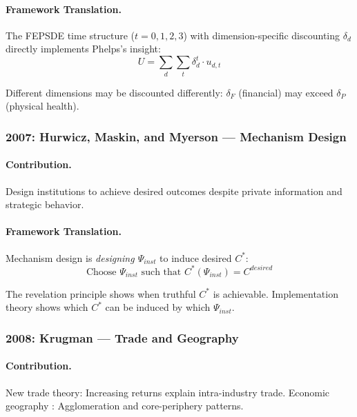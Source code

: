 \documentclass[12pt,a4paper]{article}
\begin{document}
\paragraph{Framework Translation.}
The FEPSDE time structure ($t = 0, 1, 2, 3$) with dimension-specific discounting
$\delta_d$ directly implements Phelps's insight:
\begin{equation}
  U = \sum_d \sum_t \delta_d^t \cdot u_{d,t}
\end{equation}

Different dimensions may be discounted differently:
$\delta_F$ (financial) may exceed $\delta_P$ (physical health).

\subsubsection{2007: Hurwicz, Maskin, and Myerson --- Mechanism Design}

\paragraph{Contribution.}
Design institutions to achieve desired outcomes despite private information
and strategic behavior.

\paragraph{Framework Translation.}
Mechanism design is \emph{designing $\Psi_{inst}$} to induce desired $C^*$:
\begin{equation}
  \text{Choose } \Psi_{inst} \text{ such that } C^*(\Psi_{inst}) = C^{desired}
\end{equation}

The revelation principle shows when truthful $C^*$ is achievable.
Implementation theory shows which $C^*$ can be induced by which $\Psi_{inst}$.

\subsubsection{2008: Krugman --- Trade and Geography}

\paragraph{Contribution.}
New trade theory: Increasing returns explain intra-industry trade.
Economic geography \citep{krugman1991}: Agglomeration and core-periphery patterns.
\end{document}
